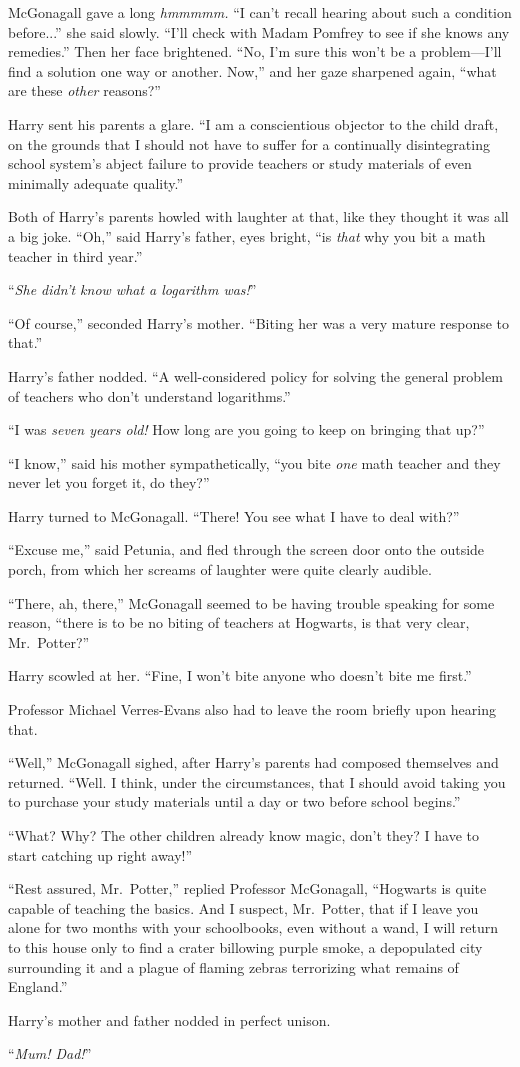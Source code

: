 McGonagall gave a long \emph{hmmmmm.} “I can’t recall hearing about such a condition before...” she said slowly. “I’ll check with Madam Pomfrey to see if she knows any remedies.” Then her face brightened. “No, I’m sure this won’t be a problem—I’ll find a solution one way or another. Now,” and her gaze sharpened again, “what are these \emph{other} reasons?”

Harry sent his parents a glare. “I am a conscientious objector to the child draft, on the grounds that I should not have to suffer for a continually disintegrating school system’s abject failure to provide teachers or study materials of even minimally adequate quality.”

Both of Harry’s parents howled with laughter at that, like they thought it was all a big joke. “Oh,” said Harry’s father, eyes bright, “is \emph{that} why you bit a math teacher in third year.”

“\emph{She didn’t know what a logarithm was!}”

“Of course,” seconded Harry’s mother. “Biting her was a very mature response to that.”

Harry’s father nodded. “A well-considered policy for solving the general problem of teachers who don’t understand logarithms.”

“I was \emph{seven years old!} How long are you going to keep on bringing that up?”

“I know,” said his mother sympathetically, “you bite \emph{one} math teacher and they never let you forget it, do they?”

Harry turned to McGonagall. “There! You see what I have to deal with?”

“Excuse me,” said Petunia, and fled through the screen door onto the outside porch, from which her screams of laughter were quite clearly audible.

“There, ah, there,” McGonagall seemed to be having trouble speaking for some reason, “there is to be no biting of teachers at Hogwarts, is that very clear, Mr.~Potter?”

Harry scowled at her. “Fine, I won’t bite anyone who doesn’t bite me first.”

Professor Michael Verres-Evans also had to leave the room briefly upon hearing that.

“Well,” McGonagall sighed, after Harry’s parents had composed themselves and returned. “Well. I think, under the circumstances, that I should avoid taking you to purchase your study materials until a day or two before school begins.”

“What? Why? The other children already know magic, don’t they? I have to start catching up right away!”

“Rest assured, Mr.~Potter,” replied Professor McGonagall, “Hogwarts is quite capable of teaching the basics. And I suspect, Mr.~Potter, that if I leave you alone for two months with your schoolbooks, even without a wand, I will return to this house only to find a crater billowing purple smoke, a depopulated city surrounding it and a plague of flaming zebras terrorizing what remains of England.”

Harry’s mother and father nodded in perfect unison.

“\emph{Mum! Dad!}”
